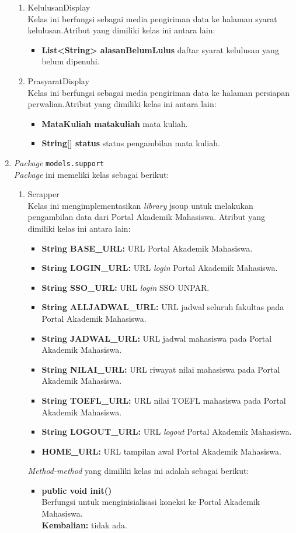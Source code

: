 \begin{enumerate}
\begin{enumerate}
		\item KelulusanDisplay\\
		Kelas ini berfungsi sebagai media pengiriman data ke halaman syarat kelulusan.Atribut yang dimiliki kelas ini antara lain:
		\begin{itemize}
			\item \textbf{List<String> alasanBelumLulus} daftar syarat kelulusan yang belum dipenuhi. 
		\end{itemize}
		\item PrasyaratDisplay\\
		Kelas ini berfungsi sebagai media pengiriman data ke halaman persiapan perwalian.Atribut yang dimiliki kelas ini antara lain:
		\begin{itemize}
			\item \textbf{MataKuliah matakuliah} mata kuliah.
			\item \textbf{String[] status} status pengambilan mata kuliah.
		\end{itemize}
	\end{enumerate}
	\item \textit{Package} \texttt{models.support}\\
	\textit{Package} ini memeliki kelas sebagai berikut:
	\begin{enumerate}
		\item Scrapper\\
		Kelas ini mengimplementasikan \textit{library} jsoup untuk melakukan pengambilan data dari Portal Akademik Mahasiswa. Atribut yang dimiliki kelas ini antara lain:
		\begin{itemize}
				\item \textbf{String BASE\_URL:} URL Portal Akademik Mahasiswa.
				\item \textbf{String LOGIN\_URL:} URL \textit{login} Portal Akademik Mahasiswa.
				\item \textbf{String SSO\_URL:} URL \textit{login} SSO UNPAR.
				\item \textbf{String ALLJADWAL\_URL:} URL jadwal seluruh fakultas pada Portal Akademik Mahasiswa.
				\item \textbf{String JADWAL\_URL:} URL jadwal mahasiswa pada Portal Akademik Mahasiswa.
				\item \textbf{String NILAI\_URL:} URL riwayat nilai mahasiswa pada Portal Akademik Mahasiswa.
				\item \textbf{String TOEFL\_URL:} URL nilai TOEFL mahasiswa pada Portal Akademik Mahasiswa.
				\item \textbf{String LOGOUT\_URL:} URL \textit{logout} Portal Akademik Mahasiswa.
				\item \textbf{HOME\_URL:} URL tampilan awal Portal Akademik Mahasiswa.
		\end{itemize}
		\textit{Method-method} yang dimiliki kelas ini adalah sebagai berikut:
		\begin{itemize}
				\item \textbf{public void init()}\\
				Berfungsi untuk menginisialisasi koneksi ke Portal Akademik Mahasiswa.\\
				\textbf{Kembalian:} tidak ada.
				

\end{itemize}
\end{enumerate}
\end{enumerate}
